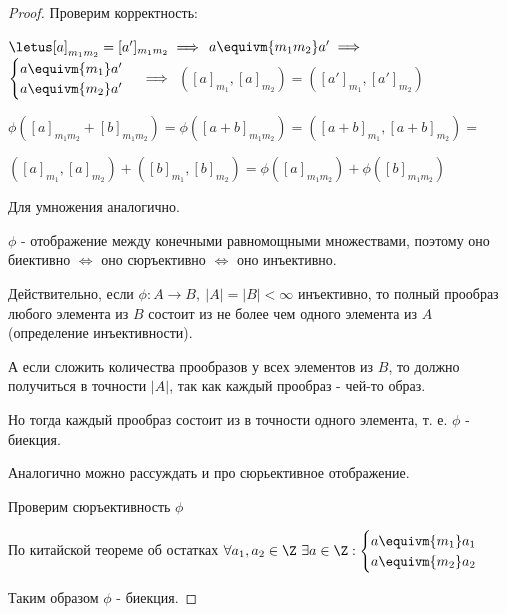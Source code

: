 \begin{proof}
    Проверим корректность:
    
    $\letus [a]_{m_1m_2} = [a']_{m_1m_2} \implies$
    $a \equivm{m_1m_2} a' \implies$
    $\begin{cases}
        a \equivm{m_1} a' \\
        a \equivm{m_2} a'
    \end{cases} \implies$
    $([a]_{m_1}, [a]_{m_2}) = ([a']_{m_1}, [a']_{m_2})$
    
    $\phi([a]_{m_1m_2} + [b]_{m_1m_2}) = \phi([a + b]_{m_1m_2}) = ([a + b]_{m_1}, [a + b]_{m_2}) = $
    
    $([a]_{m_1}, [a]_{m_2}) + ([b]_{m_1}, [b]_{m_2}) = \phi([a]_{m_1m_2}) + \phi([b]_{m_1m_2})$
    
    Для умножения аналогично.
    
    $\phi$ - отображение между конечными равномощными множествами, поэтому оно биективно $\iff$ оно сюръективно $\iff$ оно инъективно.

    Действительно, если $\phi: A \to B,~ |A| = |B| < \infty$ инъективно, 
    то полный прообраз любого элемента из $B$ состоит из не более чем одного элемента из $A$ (определение инъективности). 

    А если сложить количества прообразов у всех элементов из $B$, то должно получиться в точности $|A|$, так как каждый прообраз - чей-то образ. 

    Но тогда каждый прообраз состоит из в точности одного элемента, т. е. $\phi$ - биекция. 
    
    Аналогично можно рассуждать и про сюрьективное отображение.

    Проверим сюръективность $\phi$
    
    По китайской теореме об остатках $\forall a_1, a_2 \in \Z~ \exists a \in \Z: 
    \begin{cases}
        a \equivm{m_1} a_1 \\
        a \equivm{m_2} a_2 \\
    \end{cases}$

    Таким образом $\phi$ - биекция.
\end{proof}


